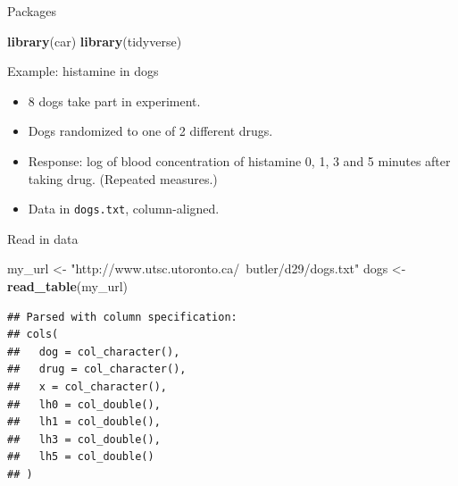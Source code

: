 \documentclass[
  ignorenonframetext,
]{beamer}
\newenvironment{Shaded}{\begin{snugshade}}{\end{snugshade}}
\newcommand{\KeywordTok}[1]{\textcolor[rgb]{0.13,0.29,0.53}{\textbf{#1}}}
\newcommand{\NormalTok}[1]{#1}
\newcommand{\StringTok}[1]{\textcolor[rgb]{0.31,0.60,0.02}{#1}}
\begin{document}
\begin{frame}[fragile]{Packages}
\protect\hypertarget{packages-5}{}

\begin{Shaded}
\begin{Highlighting}[]
\KeywordTok{library}\NormalTok{(car)}
\KeywordTok{library}\NormalTok{(tidyverse)}
\end{Highlighting}
\end{Shaded}

\end{frame}

\begin{frame}[fragile]{Example: histamine in dogs}
\protect\hypertarget{example-histamine-in-dogs}{}

\begin{itemize}
\item
  8 dogs take part in experiment.
\item
  Dogs randomized to one of 2 different drugs.
\item
  Response: log of blood concentration of histamine 0, 1, 3 and 5
  minutes after taking drug. (Repeated measures.)
\item
  Data in \texttt{dogs.txt}, column-aligned.
\end{itemize}

\end{frame}

\begin{frame}[fragile]{Read in data}
\protect\hypertarget{read-in-data-3}{}

\begin{Shaded}
\begin{Highlighting}[]
\NormalTok{my_url <-}\StringTok{ "http://www.utsc.utoronto.ca/~butler/d29/dogs.txt"}
\NormalTok{dogs <-}\StringTok{ }\KeywordTok{read_table}\NormalTok{(my_url)}
\end{Highlighting}
\end{Shaded}

\begin{verbatim}
## Parsed with column specification:
## cols(
##   dog = col_character(),
##   drug = col_character(),
##   x = col_character(),
##   lh0 = col_double(),
##   lh1 = col_double(),
##   lh3 = col_double(),
##   lh5 = col_double()
## )
\end{verbatim}

\end{frame}
\end{document}
